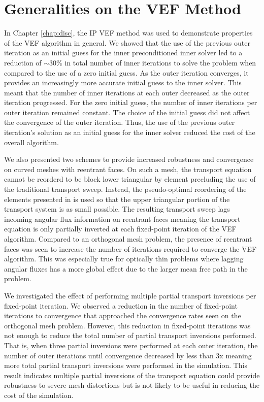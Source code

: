 \documentclass[../doc.tex]{subfiles}
\begin{document}
\section{Generalities on the VEF Method}
In Chapter \ref{chap:disc}, the IP VEF method was used to demonstrate properties of the VEF algorithm in general. We showed that the use of the previous outer iteration as an initial guess for the inner preconditioned inner solver led to a reduction of $\sim 30\%$ in total number of inner iterations to solve the problem when compared to the use of a zero initial guess.
As the outer iteration converges, it provides an increasingly more accurate initial guess to the inner solver. This meant that the number of inner iterations at each outer decreased as the outer iteration progressed. For the zero initial guess, the number of inner iterations per outer iteration remained constant. 
The choice of the initial guess did not affect the convergence of the outer iteration. Thus, the use of the previous outer iteration's solution as an initial guess for the inner solver reduced the cost of the overall algorithm. 

We also presented two schemes to provide increased robustness and convergence on curved meshes with reentrant faces. On such a mesh, the transport equation cannot be reorderd to be block lower triangular by element precluding the use of the traditional transport sweep. Instead, the pseudo-optimal reordering of the elements presented in \textcite{graph_sweeps} is used so that the upper triangular portion of the transport system is as small possible. The resulting transport sweep lags incoming angular flux information on reentrant faces meaning the transport equation is only partially inverted at each fixed-point iteration of the VEF algorithm. Compared to an orthogonal mesh problem, the presence of reentrant faces was seen to increase the number of iterations required to converge the VEF algorithm. This was especially true for optically thin problems where lagging angular fluxes has a more global effect due to the larger mean free path in the problem. 

We investigated the effect of performing multiple partial transport inversions per fixed-point iteration. We observed a reduction in the number of fixed-point iterations to convergence that approached the convergence rates seen on the orthogonal mesh problem. However, this reduction in fixed-point iterations was not enough to reduce the total number of partial transport inversions performed. That is, when three partial inversions were performed at each outer iteration, the number of outer iterations until convergence decreased by less than 3x meaning more total partial transport inversions were performed in the simulation. This result indicates multiple partial inversions of the transport equation could provide robustness to severe mesh distortions but is not likely to be useful in reducing the cost of the simulation. 
\end{document}
